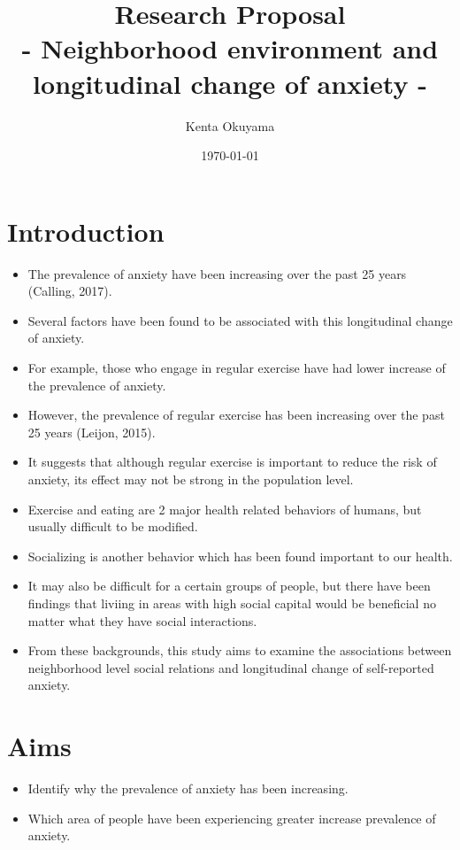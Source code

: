\documentclass{article}
\title{
	Research Proposal \\
 - Neighborhood environment and longitudinal change of anxiety -  }
\date{\today}
\author{Kenta Okuyama}
\begin{document}
\maketitle

\section{Introduction} 
\begin{itemize}
	\item The prevalence of anxiety have been increasing over the past 25 years (Calling, 2017).
	\item Several factors have been found to be associated with this longitudinal change of anxiety.
	\item For example, those who engage in regular exercise have had lower increase of the prevalence of anxiety.
	\item However, the prevalence of regular exercise has been increasing over the past 25 years (Leijon, 2015).
	\item It suggests that although regular exercise is important to reduce the risk of anxiety, its effect may not be strong in the population level.
	\item Exercise and eating are 2 major health related behaviors of humans, but usually difficult to be modified.
	\item Socializing is another behavior which has been found important to our health.
	\item It may also be difficult for a certain groups of people, but there have been findings that liviing in areas with high social capital would be beneficial no matter what they have social interactions.
	\item From these backgrounds, this study aims to examine the associations between neighborhood level social relations and longitudinal change of self-reported anxiety.
\end{itemize}

\section{Aims}
\begin{itemize}
	\item Identify why the prevalence of anxiety has been increasing.
	\item Which area of people have been experiencing greater increase prevalence of anxiety.
\end{itemize}
\end{document}

